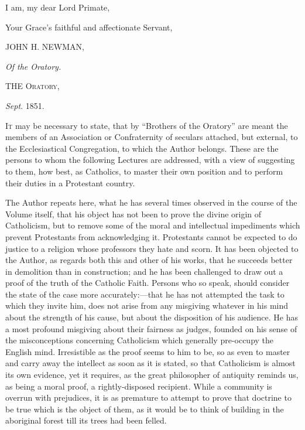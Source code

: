 I am, my dear Lord Primate,

Your Grace's faithful and affectionate Servant,


JOHN H. NEWMAN,

\emph{Of the Oratory.}


THE O\textsc{ratory},

\emph{Sept}. 1851.








I\textsc{t} may be necessary to state, that by ``Brothers
of the Oratory'' are meant the members of an
Association or Confraternity of seculars attached, but
external, to the Ecclesiastical Congregation, to which
the Author belongs. These are the persons to whom the
following Lectures are addressed, with a view of
suggesting to them, how best, as Catholics, to master
their own position and to perform their duties in a
Protestant country.


The Author repeats here, what he has several times
observed in the course of the Volume itself, that his
object has not been to prove the divine origin of
Catholicism, but to remove some of the moral and
intellectual impediments which prevent Protestants from
acknowledging it. Protestants cannot be expected to do
justice to a religion whose professors they hate and
scorn. It has been objected to the Author, as regards
both this and other of his works, that he succeeds better
in demolition than in construction; and he has been
challenged to draw out a proof of the truth of the
Catholic Faith. Persons who so speak, should consider the
state of the case more accurately:—that he has not
attempted the task to which they invite him, does not
arise from any misgiving whatever in his mind about the
strength of his cause, but about the disposition of his
audience. He has a most profound misgiving about their
fairness as judges, founded on his sense of the
misconceptions concerning Catholicism which generally
pre-occupy the English mind. Irresistible as the proof
seems to him to be, so as even to master and carry away
the intellect as soon as it is stated, so that
Catholicism is almost its own evidence, yet it requires,
as the great philosopher of antiquity reminds us, as
being a moral proof, a rightly-disposed recipient. While
a community is overrun with prejudices, it is as
premature to attempt to prove that doctrine to be true
which is the object of them, as it would be to think of
building in the aboriginal forest till its trees had been
felled.


